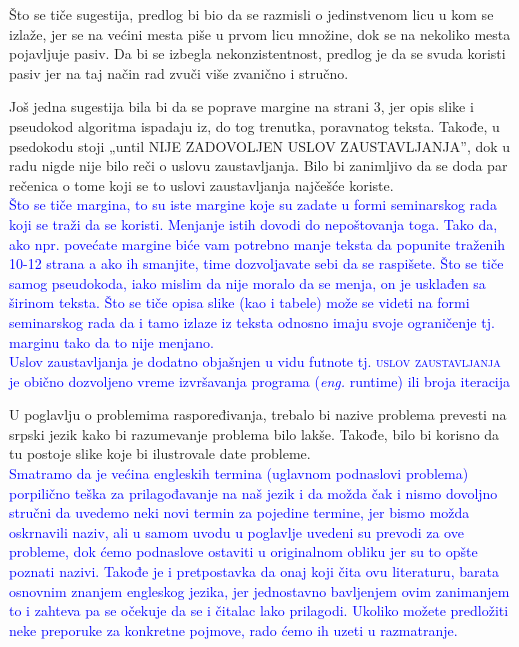 \documentclass[a4paper]{report}
\newcommand{\odgovor}[1]{\textcolor{blue}{#1}}
\newcommand{\eng}[1]{(\textit{eng.} #1)}
\begin{document}
Što se tiče sugestija, predlog bi bio da se razmisli o jedinstvenom licu u kom se izlaže, jer se na većini mesta piše u prvom licu množine, dok se na nekoliko mesta pojavljuje pasiv. Da bi se izbegla nekonzistentnost, predlog je da se svuda koristi pasiv jer na taj način rad zvuči više zvanično i stručno. 

Još jedna sugestija bila bi da se poprave margine na strani 3, jer opis slike i pseudokod algoritma ispadaju iz, do tog trenutka, poravnatog teksta. Takođe, u psedokodu stoji „until NIJE ZADOVOLJEN USLOV ZAUSTAVLJANJA”, dok u radu nigde nije bilo reči o uslovu zaustavljanja. Bilo bi zanimljivo da se doda par rečenica o tome koji se to uslovi zaustavljanja najčešće koriste.\\
\odgovor{Što se tiče margina, to su iste margine koje su zadate u formi seminarskog rada koji se traži da se koristi. Menjanje istih dovodi do nepoštovanja toga. Tako da, ako npr. povećate margine biće vam potrebno manje teksta da popunite traženih 10-12 strana a ako ih smanjite, time dozvoljavate sebi da se raspišete. 
Što se tiče samog pseudokoda, iako mislim da nije moralo da se menja, on je usklađen sa širinom teksta. Što se tiče opisa slike (kao i tabele) može se videti na formi seminarskog rada da i tamo izlaze iz teksta odnosno imaju svoje ograničenje tj. marginu tako da to nije menjano.\\
Uslov zaustavljanja je dodatno objašnjen u vidu futnote tj. \textsc{uslov zaustavljanja} je obično dozvoljeno vreme izvršavanja programa \eng{runtime} ili broja iteracija\\}

U poglavlju o problemima raspoređivanja, trebalo bi nazive problema prevesti na srpski jezik kako bi razumevanje problema bilo lakše. Takođe, bilo bi korisno da tu postoje slike koje bi ilustrovale date probleme.\\
\odgovor{Smatramo da je većina engleskih termina (uglavnom podnaslovi problema) porpilično teška za prilagođavanje na naš jezik i da možda čak i nismo dovoljno stručni da uvedemo neki novi termin za pojedine termine, jer bismo možda oskrnavili naziv, ali u samom uvodu u poglavlje uvedeni su prevodi za ove probleme, dok ćemo podnaslove ostaviti u originalnom obliku jer su to opšte poznati nazivi. Takođe je i pretpostavka da onaj koji čita ovu literaturu, barata osnovnim znanjem engleskog jezika, jer jednostavno bavljenjem ovim zanimanjem to i zahteva pa se očekuje da se i čitalac lako prilagodi. Ukoliko možete predložiti neke preporuke za konkretne pojmove, rado ćemo ih uzeti u razmatranje.\\}
\end{document}
